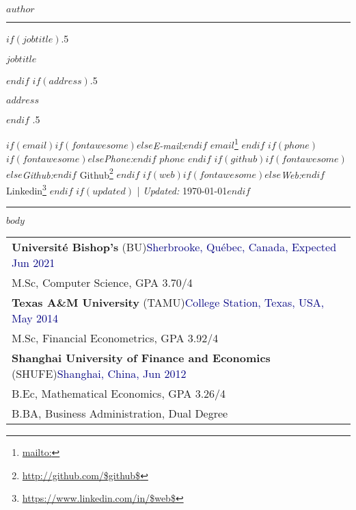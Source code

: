 \documentclass[$if(fontsize)$$fontsize$,$endif$$if(lang)$$babel-lang$,$endif$$if(papersize)$$papersize$paper,$endif$$for(classoption)$$classoption$$sep$,$endfor$]{$documentclass$}
\renewcommand{\href}[2]{#2\footnote{\url{#1}}}
\begin{document}
\centerline{\huge \bf $author$}

\vspace{2 mm}

\hrule

\vspace{2 mm}

$if(jobtitle)$\moveleft.5\hoffset\centerline{$jobtitle$}$endif$
$if(address)$\moveleft.5\hoffset\centerline{$address$}$endif$
\moveleft.5\hoffset\centerline{
$if(email)$$if(fontawesome)$\faEnvelopeO \hspace{1 mm}$else$\emph{E-mail:}$endif$ \href{mailto:}{$email$} \hspace{1 mm}$endif$ $if(phone)$$if(fontawesome)$\faPhone \hspace{1 mm}$else$\emph{Phone:}$endif$  $phone$  \hspace{1 mm} $endif$ $if(github)$$if(fontawesome)$\faGithub \hspace{1 mm}$else$\emph{Github:}$endif$ \href{http://github.com/$github$}{Github} \hspace{1 mm} $endif$ $if(web)$$if(fontawesome)$\faGlobe \hspace{1 mm}$else$\emph{Web:}$endif$ \href{https://www.linkedin.com/in/$web$}{Linkedin}  $endif$
$if(updated)$ | \emph{Updated:} \today$endif$}

\vspace{2 mm}

\hrule


$body$  %



\begin{tabular}{p{19.4cm}}
    \rule{0pt}{2mm} \textbf{Université Bishop's} \small(BU)\normalsize \hfill \textcolor{Navy}{Sherbrooke, Québec, Canada, Expected Jun 2021}\\
    \rule{0pt}{4mm} \hspace{6mm} M.Sc, Computer Science, GPA 3.70/4\\
    \rule{0pt}{4mm} \textbf{Texas A\&M University} \small(TAMU)\normalsize \hfill \textcolor{Navy}{College Station, Texas, USA, May 2014}\\
    \rule{0pt}{4mm} \hspace{6mm} M.Sc, Financial Econometrics, GPA 3.92/4\\
    \rule{0pt}{4mm} \textbf{Shanghai University of Finance and Economics} \small(SHUFE)\normalsize \hfill \textcolor{Navy}{Shanghai, China, Jun 2012}\\
    \rule{0pt}{4mm} \hspace{6mm} B.Ec, Mathematical Economics, GPA 3.26/4\\
    \rule{0pt}{4mm} \hspace{6mm} B.BA, Business Administration, Dual Degree\\
\end{tabular}
\end{document}

